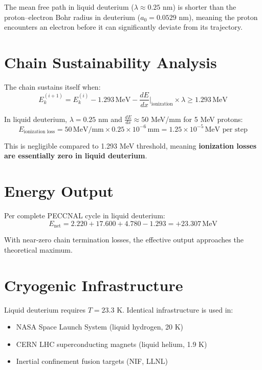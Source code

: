 \documentclass[12pt,a4paper]{article}
\begin{document}
The mean free path in liquid deuterium ($\lambda \approx 0.25$ nm)
is shorter than the proton--electron Bohr radius in deuterium
($a_0 = 0.0529$ nm), meaning the proton encounters an electron
before it can significantly deviate from its trajectory.

\section{Chain Sustainability Analysis}

The chain sustains itself when:
\begin{equation}
E_k^{(i+1)} = E_k^{(i)} - 1.293\,\text{MeV}
- \frac{dE}{dx}\bigg|_\text{ionization} \times \lambda \geq 1.293\,\text{MeV}
\end{equation}

In liquid deuterium, $\lambda = 0.25$ nm and
$\frac{dE}{dx} \approx 50$ MeV/mm for 5 MeV protons:
\begin{equation}
E_\text{ionization loss} = 50\,\text{MeV/mm} \times 0.25\times10^{-6}\,\text{mm}
= 1.25\times10^{-5}\,\text{MeV per step}
\end{equation}

This is negligible compared to 1.293 MeV threshold, meaning
\textbf{ionization losses are essentially zero in liquid deuterium}.

\section{Energy Output}

Per complete PECCNAL cycle in liquid deuterium:
\begin{equation}
E_\text{net} = 2.220 + 17.600 + 4.780 - 1.293
= \boxed{+23.307\,\text{MeV}}
\end{equation}

With near-zero chain termination losses, the effective output
approaches the theoretical maximum.

\section{Cryogenic Infrastructure}

Liquid deuterium requires $T = 23.3$ K. Identical infrastructure
is used in:
\begin{itemize}
\item NASA Space Launch System (liquid hydrogen, 20 K)
\item CERN LHC superconducting magnets (liquid helium, 1.9 K)
\item Inertial confinement fusion targets (NIF, LLNL)
\end{itemize}
\end{document}

